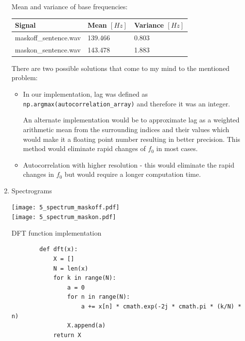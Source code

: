 \documentclass[a4paper, 11pt]{article}
\begin{document}
\begin{enumerate}
        \newpage
        Mean and variance of base frequencies: \\
        \begin{tabular}{ | l | l | l | }
            \hline
            \textbf{Signal}       & \textbf{Mean} $[Hz]$ & \textbf{Variance} $[Hz]$ \\ \hline
            maskoff\_sentence.wav & 139.466              & 0.803                    \\ \hline
            maskon\_sentence.wav  & 143.478              & 1.883                    \\ \hline
        \end{tabular}

        \vspace{2mm}
        There are two possible solutions that come to my mind to the mentioned problem:

        \begin{itemize}
            \item
            In our implementation, lag was defined as \texttt{np.argmax(autocorrelation\_array)} and therefore it was an integer.

            An alternate implementation would be to approximate lag as a weighted arithmetic mean from the surrounding indices and their values
            which would make it a floating point number resulting in better precision.
            This method would eliminate rapid changes of $f_0$ in most cases.

            \item
            Autocorrelation with higher resolution - this would eliminate the rapid changes in $f_0$
            but would require a longer computation time.
        \end{itemize}

        \item
        Spectrograms

        \texttt{[image: 5\_spectrum\_maskoff.pdf]} \\
        \texttt{[image: 5\_spectrum\_maskon.pdf]}

        \newpage

        DFT function implementation

		\begin{verbatim}
		def dft(x):
			X = []
			N = len(x)
			for k in range(N):
				a = 0
				for n in range(N):
					a += x[n] * cmath.exp(-2j * cmath.pi * (k/N) * n)
				X.append(a)
			return X
		\end{verbatim}


\end{enumerate}
\end{document}
